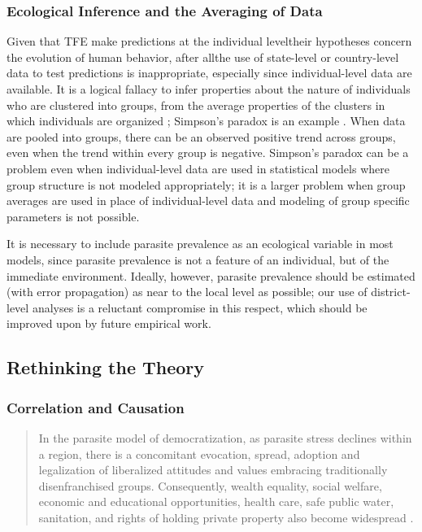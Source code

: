 \documentclass[12pt]{article}
\begin{document}
\subsubsection{Ecological Inference and the Averaging of Data}
Given that TFE make predictions at the individual level\textemdash their hypotheses concern the evolution of human behavior, after all\textemdash the use of state-level or country-level data to test predictions is inappropriate, especially since individual-level data are available.  It is a logical fallacy to infer properties about the nature of individuals who are clustered into groups, from the average properties of the clusters in which individuals are organized \citep{Freedman1999}; Simpson's paradox is an example \citep{yule1903notes, simpson1951interpretation, wagner1982simpson}. When data are pooled into groups, there can be an observed positive trend across groups, even when the trend within every group is negative. Simpson's paradox can be a problem even when individual-level data are used in statistical models where group structure is not modeled appropriately; it is a larger problem when group averages are used in place of individual-level data and modeling of group specific parameters is not possible.
	
	It is necessary to include parasite prevalence as an ecological variable in most models, since parasite prevalence is not a feature of an individual, but of the immediate environment.  Ideally, however, parasite prevalence should be estimated (with error propagation) as near to the local level as possible; our use of district-level analyses is a reluctant compromise in this respect, which should be improved upon by future empirical work.
	

\subsection{Rethinking the Theory}
\subsubsection{Correlation and Causation}
\begin{quote}
\small
In the parasite model of democratization, as parasite stress declines within a region, there is a concomitant evocation, spread, adoption and legalization of liberalized attitudes and values embracing traditionally disenfranchised groups. Consequently, wealth equality, social welfare, economic and educational opportunities, health care, safe public water, sanitation, and rights of holding private property also become widespread \citep[pg117]{Thornhill2009}.
\end{quote}  
\end{document}
